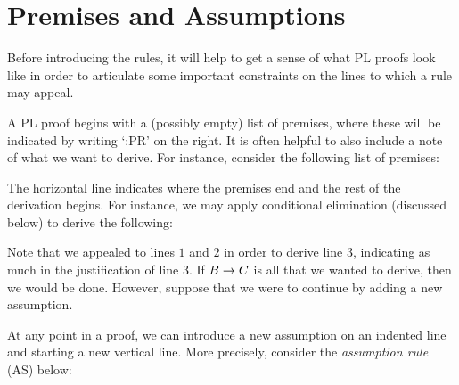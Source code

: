 \section{Premises and Assumptions}
\label{sec:PremiseAssumption}

Before introducing the rules, it will help to get a sense of what PL proofs look like in order to articulate some important constraints on the lines to which a rule may appeal.

A PL proof begins with a (possibly empty) list of premises, where these will be indicated by writing `:PR' on the right.
It is often helpful to also include a note of what we want to derive.
For instance, consider the following list of premises:
\begin{fitchproof}
   \pr{}
   \pr{}
\end{fitchproof}
The horizontal line indicates where the premises end and the rest of the derivation begins.
For instance, we may apply conditional elimination (discussed below) to derive the following:
\begin{fitchproof}
   \pr{}
   \pr{}
   
\end{fitchproof}
Note that we appealed to lines $1$ and $2$ in order to derive line $3$, indicating as much in the justification of line $3$. 
If $B \rightarrow C$ is all that we wanted to derive, then we would be done. 
However, suppose that we were to continue by adding a new assumption.
\begin{fitchproof}
   \pr{}
   \pr{}
   
  \open
     \as{}
  \close
\end{fitchproof}
At any point in a proof, we can introduce a new assumption on an indented line and starting a new vertical line.
More precisely, consider the \textit{assumption rule} (AS) below:
